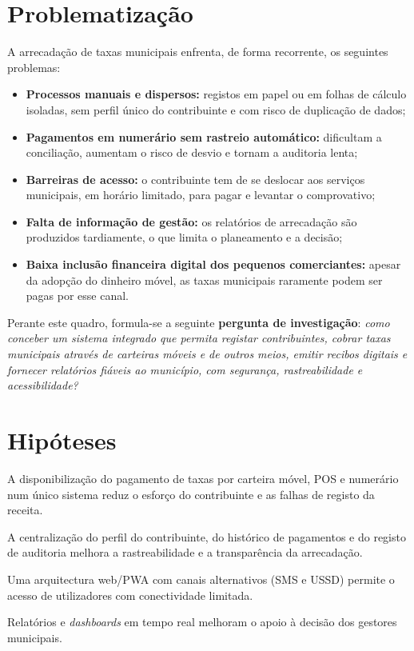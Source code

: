 \documentclass[12pt,a4paper,openany]{report}
\begin{document}
\section{Problematização}
A arrecadação de taxas municipais enfrenta, de forma recorrente, os seguintes problemas:
\begin{itemize}
\item \textbf{Processos manuais e dispersos:} registos em papel ou em folhas de cálculo isoladas, sem perfil único do contribuinte e com risco de duplicação de dados;
\item \textbf{Pagamentos em numerário sem rastreio automático:} dificultam a conciliação, aumentam o risco de desvio e tornam a auditoria lenta;
\item \textbf{Barreiras de acesso:} o contribuinte tem de se deslocar aos serviços municipais, em horário limitado, para pagar e levantar o comprovativo;
\item \textbf{Falta de informação de gestão:} os relatórios de arrecadação são produzidos tardiamente, o que limita o planeamento e a decisão;
\item \textbf{Baixa inclusão financeira digital dos pequenos comerciantes:} apesar da adopção do dinheiro móvel, as taxas municipais raramente podem ser pagas por esse canal.
\end{itemize}

Perante este quadro, formula-se a seguinte \textbf{pergunta de investigação}: \emph{como conceber um sistema integrado que permita registar contribuintes, cobrar taxas municipais através de carteiras móveis e de outros meios, emitir recibos digitais e fornecer relatórios fiáveis ao município, com segurança, rastreabilidade e acessibilidade?}

\section{Hipóteses}
\begin{description}[leftmargin=1.5cm,style=nextline]
\item[H1.] A disponibilização do pagamento de taxas por carteira móvel, POS e numerário num único sistema reduz o esforço do contribuinte e as falhas de registo da receita.
\item[H2.] A centralização do perfil do contribuinte, do histórico de pagamentos e do registo de auditoria melhora a rastreabilidade e a transparência da arrecadação.
\item[H3.] Uma arquitectura web/PWA com canais alternativos (SMS e USSD) permite o acesso de utilizadores com conectividade limitada.
\item[H4.] Relatórios e \emph{dashboards} em tempo real melhoram o apoio à decisão dos gestores municipais.
\end{description}
\end{document}

